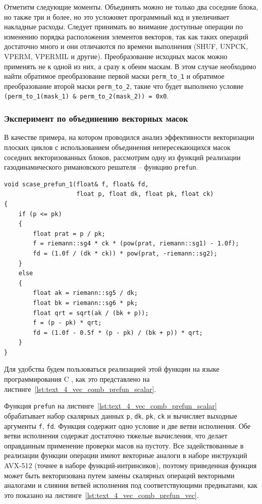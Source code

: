 Отметитм следующие моменты.
Объединять можно не только два соседние блока, но также три и более, но это усложняет программный код и увеличивает накладные расходы.
Следует принимать во внимание доступные операции по изменению порядка расположения элементов векторов, так как таких операций достаточно много и они отличаются по времени выполнения (SHUF, UNPCK, VPERM, VPERMIL и другие).
Преобразование исходных масок можно применять не к одной из них, а сразу к обеим маскам.
В этом случае необходимо найти обратимое преобразование первой маски \texttt{perm\_to\_1} и обратимое преобразование второй маски \texttt{perm\_to\_2}, такие что будет выполнено условие \texttt{(perm\_to\_1(mask\_1) \& perm\_to\_2(mask\_2)) = 0x0}.

\subsubsection{Эксперимент по объединению векторных масок}\label{sec:text_4_comb_mask_analyze}

В качестве примера, на котором проводился анализ эффективности векторизации плоских циклов с использованием объединения непересекающихся масок соседних векторизованных блоков, рассмотрим одну из функций реализации газодинамического римановского решателя -- функцию \texttt{prefun}.

\begin{singlespace}
\begin{lstlisting}[caption={Скалярная версия функции \texttt{prefun} из состава \\ римановского решателя.},label={lst:text_4_vec_comb_prefun_scalar}]
void scase_prefun_1(float& f, float& fd,
                    float p, float dk, float pk, float ck)
{
    if (p <= pk)
    {
        float prat = p / pk;
        f = riemann::sg4 * ck * (pow(prat, riemann::sg1) - 1.0f);
        fd = (1.0f / (dk * ck)) * pow(prat, -riemann::sg2);
    }
    else
    {
        float ak = riemann::sg5 / dk;
        float bk = riemann::sg6 * pk;
        float qrt = sqrt(ak / (bk + p));
        f = (p - pk) * qrt;
        fd = (1.0f - 0.5f * (p - pk) / (bk + p)) * qrt;
    }
}
\end{lstlisting}
\end{singlespace}

Для удобства будем пользоваться реализацией этой функции на языке программирования C \cite{riemannvecGithub}, как это представлено на листинге~\ref{lst:text_4_vec_comb_prefun_scalar}.

Функция \texttt{prefun} на листинге~\ref{lst:text_4_vec_comb_prefun_scalar} обрабатывает набор скалярных данных \texttt{p}, \texttt{dk}, \texttt{pk}, \texttt{ck} и вычисляет выходные аргументы \texttt{f}, \texttt{fd}.
Функция содержит одно условие и две ветви исполнения.
Обе ветви исполнения содержат достаточно тяжелые вычисления, что делает оправданным применение проверки масов на пустоту.
Все задействованные в реализации функции операции имеют векторные аналоги в наборе инструкций AVX-512\label{abbr:avx-11} (точнее в наборе функций-интринсиков), поэтому приведенная функция может быть векторизована путем замены скалярных операций векторными аналогами и слияния ветвей исполнения под соответствующими предикатами, как это показано на листинге~\ref{lst:text_4_vec_comb_prefun_vec}.

